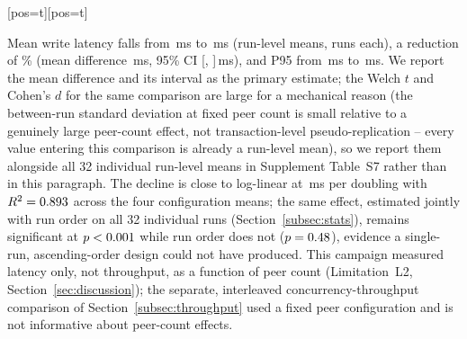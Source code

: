 \documentclass[a4paper,fleqn]{cas-sc}
\makeatletter
\newenvironment{widefig}[1][pos=t]
  {\ifdoublecol \@nameuse{figure*}[#1]\else \@nameuse{figure}[#1]\fi}
  {\ifdoublecol \@nameuse{endfigure*}\else \@nameuse{endfigure}\fi}
\makeatother
\begin{document}
\begin{widefig}
\centering
{}
\caption{Write latency by configured logical peer multiplicity. Small,
  semi-transparent points are the \PartRunsPerConfig{} individual live-run
  means at each peer count (colour identifies the counterbalanced block,
  Supplement Table~S8), jittered horizontally so overlapping runs remain
  visible; large markers and error bars show the group mean and its 95\%
  CI (P95 as a separate series). The experiment varied logical peers on
  four fixed physical hosts and did not measure throughput as a function
  of peer count (Section~\ref{subsec:scaling}); the concurrency-throughput
  experiment in Section~\ref{subsec:throughput} used a fixed peer
  configuration.}
\label{fig:scaling}
\end{widefig}

Mean write latency falls from \ScaleMinPeerMean\,ms to \ScaleMaxPeerMean\,ms
(run-level means, \PartRunsPerConfig{} runs each), a reduction of
\ScaleLatencyDropPct\% (mean difference \ScaleDiffMs\,ms, 95\% CI
[\ScaleDiffCILow, \ScaleDiffCIHigh]\,ms), and P95 from
\ScaleMinPeerPNinetyFive\,ms to \ScaleMaxPeerPNinetyFive\,ms. We report the
mean difference and its interval as the primary estimate; the Welch $t$
and Cohen's $d$ for the same comparison are large for a mechanical reason
(the between-run standard deviation at fixed peer count is small relative
to a genuinely large peer-count effect, not transaction-level
pseudo-replication -- every value entering this comparison is already a
run-level mean), so we report them alongside all 32 individual run-level
means in Supplement Table~S7 rather than in this paragraph. The decline is
close to
log-linear at \ScaleSlope\,ms per doubling with $R^2 = 0.893$
across the four configuration means; the same effect, estimated jointly
with run order on all 32 individual runs (Section~\ref{subsec:stats}),
remains significant at $p<0.001$ while run order does not
($p=0.48$), evidence a single-run, ascending-order design
could not have produced. This campaign measured latency only, not
throughput, as a function of peer count (Limitation~L2,
Section~\ref{sec:discussion}); the separate, interleaved
concurrency-throughput comparison of Section~\ref{subsec:throughput} used
a fixed peer configuration and is not informative about peer-count
effects.
\end{document}
